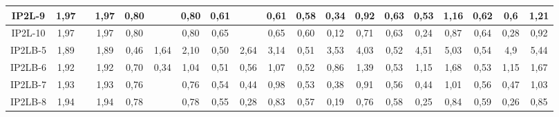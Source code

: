 \begin{table}[h]
{\begin{tabular}{c|c|c|c|c|c|c|c|c|c|c|c|c|c|c|c|c|c|c|}
\multicolumn{1}{|c|}{IP2L-9} & {\color[HTML]{656565} 1,97} & {\color[HTML]{656565} } & 1,97 & {\color[HTML]{656565} 0,80} & {\color[HTML]{656565} } & 0,80 & {\color[HTML]{656565} 0,61} & {\color[HTML]{656565} } & 0,61 & {\color[HTML]{656565} 0,58} & {\color[HTML]{656565} 0,34} & 0,92 & {\color[HTML]{656565} 0,63} & {\color[HTML]{656565} 0,53} & 1,16 & {\color[HTML]{656565} 0,62} & {\color[HTML]{656565} 0,6} & 1,21 \\ \hline
\multicolumn{1}{|c|}{IP2L-10} & {\color[HTML]{656565} 1,97} & {\color[HTML]{656565} } & 1,97 & {\color[HTML]{656565} 0,80} & {\color[HTML]{656565} } & 0,80 & {\color[HTML]{656565} 0,65} & {\color[HTML]{656565} } & 0,65 & {\color[HTML]{656565} 0,60} & {\color[HTML]{656565} 0,12} & 0,71 & {\color[HTML]{656565} 0,63} & {\color[HTML]{656565} 0,24} & 0,87 & {\color[HTML]{656565} 0,64} & {\color[HTML]{656565} 0,28} & 0,92 \\ \hline
\multicolumn{1}{|c|}{IP2LB-5} & {\color[HTML]{656565} 1,89} & {\color[HTML]{656565} } & 1,89 & {\color[HTML]{656565} 0,46} & {\color[HTML]{656565} 1,64} & 2,10 & {\color[HTML]{656565} 0,50} & {\color[HTML]{656565} 2,64} & 3,14 & {\color[HTML]{656565} 0,51} & {\color[HTML]{656565} 3,53} & 4,03 & {\color[HTML]{656565} 0,52} & {\color[HTML]{656565} 4,51} & 5,03 & {\color[HTML]{656565} 0,54} & {\color[HTML]{656565} 4,9} & 5,44 \\ \hline
\multicolumn{1}{|c|}{IP2LB-6} & {\color[HTML]{656565} 1,92} & {\color[HTML]{656565} } & 1,92 & {\color[HTML]{656565} 0,70} & {\color[HTML]{656565} 0,34} & 1,04 & {\color[HTML]{656565} 0,51} & {\color[HTML]{656565} 0,56} & 1,07 & {\color[HTML]{656565} 0,52} & {\color[HTML]{656565} 0,86} & 1,39 & {\color[HTML]{656565} 0,53} & {\color[HTML]{656565} 1,15} & 1,68 & {\color[HTML]{656565} 0,53} & {\color[HTML]{656565} 1,15} & 1,67 \\ \hline
\multicolumn{1}{|c|}{IP2LB-7} & {\color[HTML]{656565} 1,93} & {\color[HTML]{656565} } & 1,93 & {\color[HTML]{656565} 0,76} & {\color[HTML]{656565} } & 0,76 & {\color[HTML]{656565} 0,54} & {\color[HTML]{656565} 0,44} & 0,98 & {\color[HTML]{656565} 0,53} & {\color[HTML]{656565} 0,38} & 0,91 & {\color[HTML]{656565} 0,56} & {\color[HTML]{656565} 0,44} & 1,01 & {\color[HTML]{656565} 0,56} & {\color[HTML]{656565} 0,47} & 1,03 \\ \hline
\multicolumn{1}{|c|}{IP2LB-8} & {\color[HTML]{656565} 1,94} & {\color[HTML]{656565} } & 1,94 & {\color[HTML]{656565} 0,78} & {\color[HTML]{656565} } & 0,78 & {\color[HTML]{656565} 0,55} & {\color[HTML]{656565} 0,28} & 0,83 & {\color[HTML]{656565} 0,57} & {\color[HTML]{656565} 0,19} & 0,76 & {\color[HTML]{656565} 0,58} & {\color[HTML]{656565} 0,25} & 0,84 & {\color[HTML]{656565} 0,59} & {\color[HTML]{656565} 0,26} & 0,85 \\ \hline

\end{tabular}}
\end{table}
